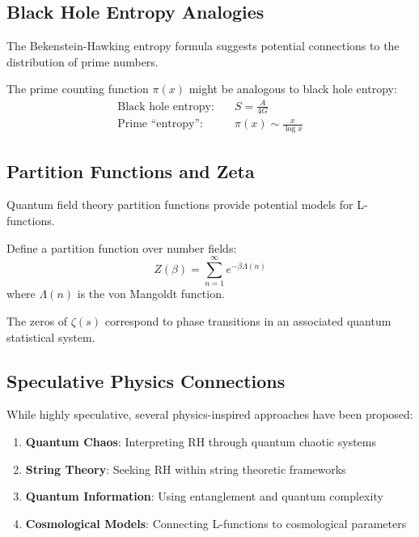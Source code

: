 \subsection{Black Hole Entropy Analogies}

The Bekenstein-Hawking entropy formula suggests potential connections to the distribution of prime numbers.

\begin{analogy}
\label{analogy:prime_entropy}
The prime counting function $\pi(x)$ might be analogous to black hole entropy:
\begin{align}
\text{Black hole entropy:} \quad & S = \frac{A}{4G} \\
\text{Prime ``entropy'':} \quad & \pi(x) \sim \frac{x}{\log x}
\label{eq:prime_entropy_analogy}
\end{align}
\end{analogy}

\subsection{Partition Functions and Zeta}

Quantum field theory partition functions provide potential models for L-functions.

\begin{definition}
\label{def:nt_partition_function}
Define a partition function over number fields:
\begin{equation}
Z(\beta) = \sum_{n=1}^{\infty} e^{-\beta \Lambda(n)}
\label{eq:nt_partition_function}
\end{equation}
where $\Lambda(n)$ is the von Mangoldt function.
\end{definition}

\begin{conjecture}
\label{conj:quantum_statistical_rh}
The zeros of $\zeta(s)$ correspond to phase transitions in an associated quantum statistical system.
\end{conjecture}

\subsection{Speculative Physics Connections}

While highly speculative, several physics-inspired approaches have been proposed:

\begin{enumerate}
\item \textbf{Quantum Chaos}: Interpreting RH through quantum chaotic systems
\item \textbf{String Theory}: Seeking RH within string theoretic frameworks
\item \textbf{Quantum Information}: Using entanglement and quantum complexity
\item \textbf{Cosmological Models}: Connecting L-functions to cosmological parameters
\end{enumerate}

